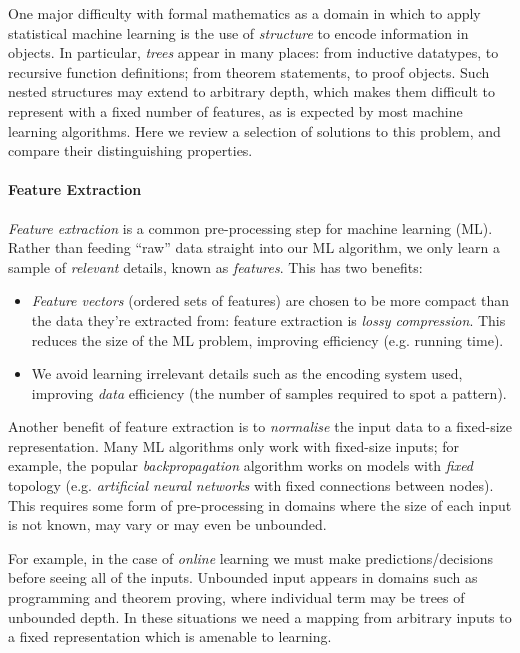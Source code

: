 One major difficulty with formal mathematics as a domain in which to apply
statistical machine learning is the use of \emph{structure} to encode
information in objects. In particular, \emph{trees} appear in many places: from
inductive datatypes, to recursive function definitions; from theorem statements,
to proof objects. Such nested structures may extend to arbitrary depth, which
makes them difficult to represent with a fixed number of features, as is
expected by most machine learning algorithms. Here we review a selection of
solutions to this problem, and compare their distinguishing properties.

\paragraph{Feature Extraction}\label{sec:featureextraction}

\emph{Feature extraction} is a common pre-processing step for machine learning
(ML). Rather than feeding ``raw'' data straight into our ML algorithm, we only
learn a sample of \emph{relevant} details, known as \emph{features}. This has
two benefits:

\begin{itemize}
\item \emph{Feature vectors} (ordered sets of features) are chosen to be more
  compact than the data they're extracted from: feature extraction is
  \emph{lossy compression}. This reduces the size of the ML problem, improving
  efficiency (e.g. running time).
\item We avoid learning irrelevant details such as the encoding system used,
  improving \emph{data} efficiency (the number of samples required to spot a
  pattern).
\end{itemize}

Another benefit of feature extraction is to \emph{normalise} the input data to a
fixed-size representation. Many ML algorithms only work with fixed-size inputs;
for example, the popular \emph{backpropagation} \cite{Russell:2003:AIM:773294}
algorithm works on models with \emph{fixed} topology (e.g. \emph{artificial
  neural networks} with fixed connections between nodes). This requires some
form of pre-processing in domains where the size of each input is not known, may
vary or may even be unbounded.

For example, in the case of \emph{online} learning we must make
predictions/decisions before seeing all of the inputs. Unbounded input appears
in domains such as programming and theorem proving, where individual term may be
trees of unbounded depth. In these situations we need a mapping from arbitrary
inputs to a fixed representation which is amenable to learning.

